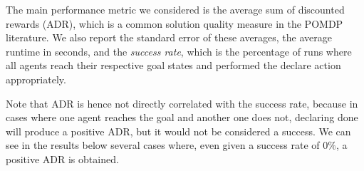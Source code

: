 \documentclass[letterpaper]{article} %
\begin{document}
The main performance metric we considered is the average sum of discounted rewards (ADR), which is a common solution quality measure in the POMDP literature. 
We also report the standard error of these averages, the average runtime in seconds, 
and the \emph{success rate}, which is the percentage of runs where all agents reach their respective goal states and performed the declare action appropriately. 

Note that ADR is hence not directly correlated with the success rate, because in cases where one agent reaches the goal and another one does not, declaring done will produce a positive ADR, but it would not be considered a success. We can see in the results below several cases where, even given a success rate of $0\%$, a positive ADR is obtained.

 
\end{document}

